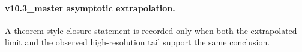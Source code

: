 \paragraph{v10.3_master asymptotic extrapolation.}
A theorem-style closure statement is recorded only when both the extrapolated limit and the
observed high-resolution tail support the same conclusion.
